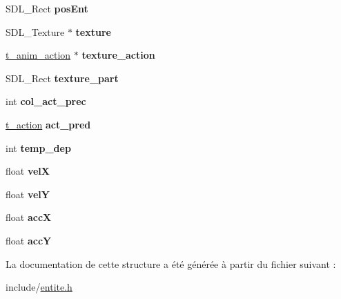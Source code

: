 \begin{DoxyCompactItemize}
\mbox{\label{structs__entite_a38d21de8b1a821ee6d1b8639e0e81651}} 
S\+D\+L\+\_\+\+Rect {\bfseries pos\+Ent}
\item 
\mbox{\label{structs__entite_a827af70c6a30ecc5eecc6317f6c2b855}} 
S\+D\+L\+\_\+\+Texture $\ast$ {\bfseries texture}
\item 
\mbox{\label{structs__entite_a0927bc2b0fa101461caa9b21177de940}} 
\hyperlink{structt__anim__action}{t\+\_\+anim\+\_\+action} $\ast$ {\bfseries texture\+\_\+action}
\item 
\mbox{\label{structs__entite_a80927970b79d3df3158f306243d9d481}} 
S\+D\+L\+\_\+\+Rect {\bfseries texture\+\_\+part}
\item 
\mbox{\label{structs__entite_a98af5c5c77a14634c18f1b484798def2}} 
int {\bfseries col\+\_\+act\+\_\+prec}
\item 
\mbox{\label{structs__entite_a069012cbf542056bc833ce90a0d53eb6}} 
\hyperlink{entite_8h_abf8170fe3a93ebd8f3701bbf092ece99}{t\+\_\+action} {\bfseries act\+\_\+pred}
\item 
\mbox{\label{structs__entite_a48a8316944ef8b57b2b09c81573c3d30}} 
int {\bfseries temp\+\_\+dep}
\item 
\mbox{\label{structs__entite_aa99b15602879121a005f7766de54b0c3}} 
float {\bfseries velX}
\item 
\mbox{\label{structs__entite_a40af39b99b6c4420d16de9c88d2cbab6}} 
float {\bfseries velY}
\item 
\mbox{\label{structs__entite_a280f04f96caa27f11ca1c5d1a397b6ff}} 
float {\bfseries accX}
\item 
\mbox{\label{structs__entite_a4d968eef8d7a52ae9cf2072dfc1d634e}} 
float {\bfseries accY}
\end{DoxyCompactItemize}


La documentation de cette structure a été générée à partir du fichier suivant \+:\begin{DoxyCompactItemize}
\item 
include/\hyperlink{entite_8h}{entite.\+h}\end{DoxyCompactItemize}
